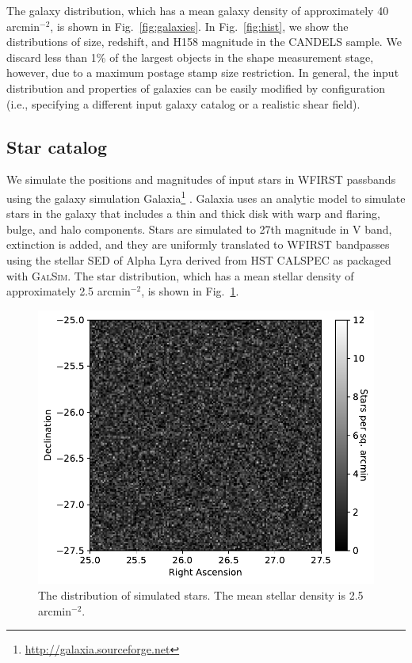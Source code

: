 \documentclass[usenatbib]{mnras}
\newcommand{\galsim}{\textsc{GalSim}}
\begin{document}
The galaxy distribution, which has a mean galaxy density of approximately 40 arcmin$^{-2}$, is shown in Fig.~\ref{fig:galaxies}. 
In Fig.~\ref{fig:hist}, we show the distributions of size, redshift, and H158 magnitude in the CANDELS sample. 
We discard less than 1\% of the largest objects in the shape measurement stage, however, due to a maximum postage stamp size restriction. 
In general, the input distribution and properties of galaxies can be easily modified by configuration (i.e., specifying a different input galaxy catalog or a realistic shear field).

\subsection{Star catalog}\label{starcat}

We simulate the positions and magnitudes of input stars in WFIRST passbands using the galaxy simulation Galaxia\footnote{\url{http://galaxia.sourceforge.net}} \citep{galaxia}. 
Galaxia uses an analytic model \citep{galaxia2} to simulate stars in the galaxy that includes a thin and thick disk with warp and flaring, bulge, and halo components. 
Stars are simulated to 27th magnitude in V band, extinction is added, and they are uniformly translated to WFIRST bandpasses using the stellar SED of Alpha Lyra derived from HST CALSPEC as packaged with \galsim.  The star distribution, which has a mean stellar density of approximately 2.5 arcmin$^{-2}$, is shown in Fig.~\ref{fig:stars}. 


\begin{figure}
\begin{center}
\includegraphics[width=\columnwidth]{figures/stars.pdf}
\end{center}
\caption[]{
The distribution of simulated stars. The mean stellar density is 2.5 arcmin$^{-2}$. 
\label{fig:stars}}
\end{figure}
\end{document}
